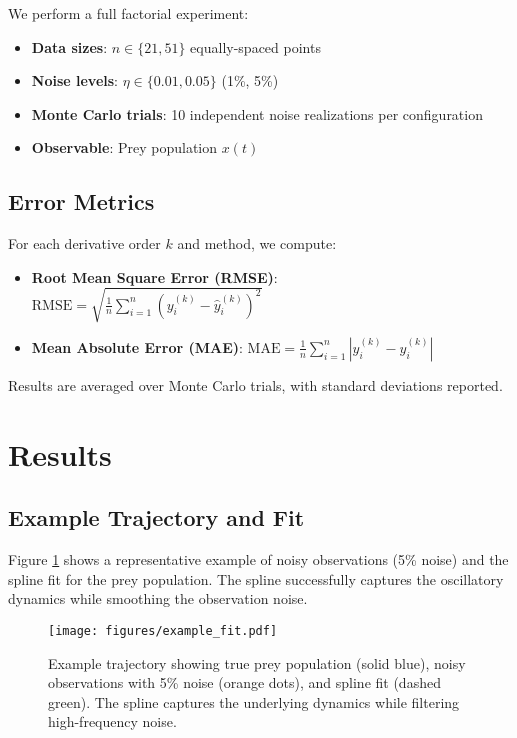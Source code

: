 \documentclass[11pt,a4paper]{article}
\begin{document}
We perform a full factorial experiment:
\begin{itemize}
    \item \textbf{Data sizes}: $n \in \{21, 51\}$ equally-spaced points
    \item \textbf{Noise levels}: $\eta \in \{0.01, 0.05\}$ (1\%, 5\%)
    \item \textbf{Monte Carlo trials}: 10 independent noise realizations per configuration
    \item \textbf{Observable}: Prey population $x(t)$
\end{itemize}

\subsection{Error Metrics}

For each derivative order $k$ and method, we compute:
\begin{itemize}
    \item \textbf{Root Mean Square Error (RMSE)}:
    $\text{RMSE} = \sqrt{\frac{1}{n}\sum_{i=1}^n (y^{(k)}_i - \hat{y}^{(k)}_i)^2}$
    \item \textbf{Mean Absolute Error (MAE)}:
    $\text{MAE} = \frac{1}{n}\sum_{i=1}^n |y^{(k)}_i - \hat{y}^{(k)}_i|$
\end{itemize}

Results are averaged over Monte Carlo trials, with standard deviations reported.

\section{Results}

\subsection{Example Trajectory and Fit}

Figure \ref{fig:example_fit} shows a representative example of noisy observations (5\% noise) and the spline fit for the prey population. The spline successfully captures the oscillatory dynamics while smoothing the observation noise.

\begin{figure}[H]
\centering
\texttt{[image: figures/example\_fit.pdf]}
\caption{Example trajectory showing true prey population (solid blue), noisy observations with 5\% noise (orange dots), and spline fit (dashed green). The spline captures the underlying dynamics while filtering high-frequency noise.}
\label{fig:example_fit}
\end{figure}
\end{document}
